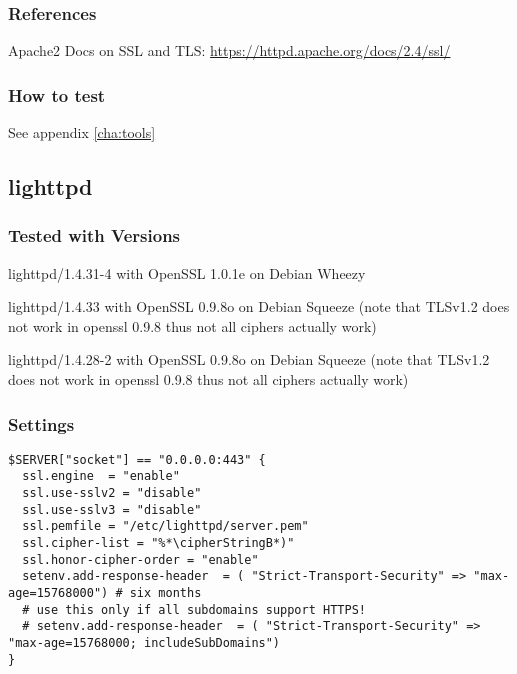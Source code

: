 
\subsubsection{References}
\begin{itemize*}
  \item Apache2 Docs on SSL and TLS: \url{https://httpd.apache.org/docs/2.4/ssl/}
\end{itemize*}


\subsubsection{How to test}
See appendix \ref{cha:tools}


\subsection{lighttpd}

\subsubsection{Tested with Versions}
\begin{itemize*}
  \item lighttpd/1.4.31-4 with OpenSSL 1.0.1e on Debian Wheezy
  \item lighttpd/1.4.33 with OpenSSL 0.9.8o on Debian Squeeze (note that TLSv1.2 does not work in openssl 0.9.8 thus not all ciphers actually work)
  \item lighttpd/1.4.28-2 with OpenSSL 0.9.8o on Debian Squeeze (note that TLSv1.2 does not work in openssl 0.9.8 thus not all ciphers actually work)
\end{itemize*}


\subsubsection{Settings}
\begin{lstlisting}
$SERVER["socket"] == "0.0.0.0:443" {
  ssl.engine  = "enable"
  ssl.use-sslv2 = "disable"
  ssl.use-sslv3 = "disable"
  ssl.pemfile = "/etc/lighttpd/server.pem"
  ssl.cipher-list = "%*\cipherStringB*)"
  ssl.honor-cipher-order = "enable"
  setenv.add-response-header  = ( "Strict-Transport-Security" => "max-age=15768000") # six months
  # use this only if all subdomains support HTTPS!
  # setenv.add-response-header  = ( "Strict-Transport-Security" => "max-age=15768000; includeSubDomains")
}
\end{lstlisting}

